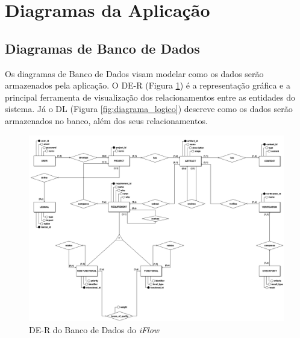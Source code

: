 \section{Diagramas da Aplicação}

\label{sec:diagramas_da_aplicacao}

\subsection{Diagramas de Banco de Dados}

Os diagramas de Banco de Dados visam modelar como os dados serão armazenados pela aplicação. O DE-R (Figura \ref{fig:diagrama_conceitual}) é a representação gráfica e a principal ferramenta de visualização dos relacionamentos entre as entidades do sistema. Já o DL (Figura \ref{fig:diagrama_logico}) descreve como os dados serão armazenados no banco, além dos seus relacionamentos.

\begin{figure}[H]
    \begin{center}
        \caption{{DE-R do Banco de Dados do \textit{iFlow}}}
        \label{fig:diagrama_conceitual}
        \includegraphics[scale=0.31]{figuras/Proposta/Conceitual_iFlow.png}
    \end{center}
\end{figure}

